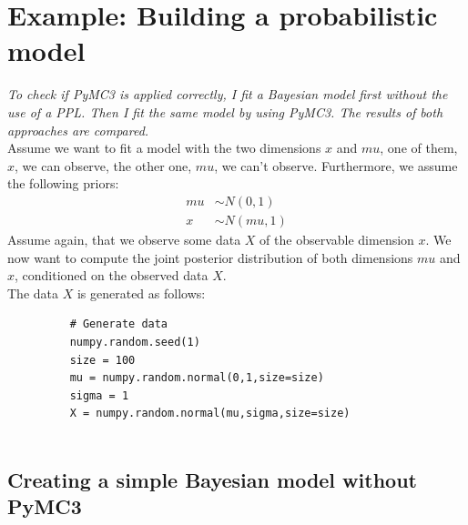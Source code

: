 \documentclass{article}
\begin{document}
\section{Example: Building a probabilistic model}
\label{sec:Comparison}
\textit{To check if PyMC3 is applied correctly, I fit a Bayesian model first without the use of a PPL. Then I fit the same model by using PyMC3. The results of both approaches are compared.}
\\
Assume we want to fit a model with the two dimensions $x$ and $mu$, one of them, $x$, we can observe, the other one, $mu$, we can't observe. Furthermore, we assume the following priors:
\begin{equation}
\begin{split}
mu &\sim N(0,1)\\
x &\sim N(mu,1)
\end{split}
\end{equation}
Assume again, that we observe some data $X$ of the observable dimension $x$.
We now want to compute the joint posterior distribution of both dimensions $mu$ and $x$, conditioned on the observed data $X$.
\\
The data $X$ is generated as follows:\\
\begin{figure}[h]
	\begin{lstlisting}
	# Generate data
	numpy.random.seed(1)
	size = 100
	mu = numpy.random.normal(0,1,size=size)
	sigma = 1
	X = numpy.random.normal(mu,sigma,size=size)
	
	\end{lstlisting}
	\label{fig:groundtruth_example_code_data_generation}
\end{figure}
\subsection{Creating a simple Bayesian model without PyMC3}
\label{subsec: Complete example of a simple Bayesian model}
\end{document}
